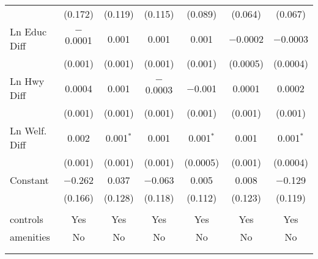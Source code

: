 \begin{table}[!htbp]
\begin{tabular}{@{\extracolsep{5pt}}lcccccc}
  & (0.172) & (0.119) & (0.115) & (0.089) & (0.064) & (0.067) \\ 
  Ln Educ Diff & $-$0.0001 & 0.001 & 0.001 & 0.001 & $-$0.0002 & $-$0.0003 \\ 
  & (0.001) & (0.001) & (0.001) & (0.001) & (0.0005) & (0.0004) \\ 
  Ln Hwy Diff & 0.0004 & 0.001 & $-$0.0003 & $-$0.001 & 0.0001 & 0.0002 \\ 
  & (0.001) & (0.001) & (0.001) & (0.001) & (0.001) & (0.001) \\ 
  Ln Welf. Diff & 0.002 & 0.001$^{*}$ & 0.001 & 0.001$^{*}$ & 0.001 & 0.001$^{*}$ \\ 
  & (0.001) & (0.001) & (0.001) & (0.0005) & (0.001) & (0.0004) \\ 
  Constant & $-$0.262 & 0.037 & $-$0.063 & 0.005 & 0.008 & $-$0.129 \\ 
  & (0.166) & (0.128) & (0.118) & (0.112) & (0.123) & (0.119) \\ 
 \hline \\[-1.8ex] 
controls & Yes & Yes & Yes & Yes & Yes & Yes \\ 
amenities & No & No & No & No & No & No \\ 
\hline \\[-1.8ex] 
\hline 
\hline \\[-1.8ex] 
\end{tabular} 
\end{table} 
